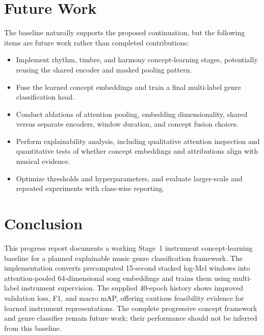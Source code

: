 \documentclass[conference]{IEEEtran}
\begin{document}
\section{Future Work}
The baseline naturally supports the proposed continuation, but the following items are future work rather than completed contributions:
\begin{itemize}
\item Implement rhythm, timbre, and harmony concept-learning stages, potentially reusing the shared encoder and masked pooling pattern.
\item Fuse the learned concept embeddings and train a final multi-label genre classification head.
\item Conduct ablations of attention pooling, embedding dimensionality, shared versus separate encoders, window duration, and concept fusion choices.
\item Perform explainability analysis, including qualitative attention inspection and quantitative tests of whether concept embeddings and attributions align with musical evidence.
\item Optimize thresholds and hyperparameters, and evaluate larger-scale and repeated experiments with class-wise reporting.
\end{itemize}

\section{Conclusion}
This progress report documents a working Stage~1 instrument concept-learning baseline for a planned explainable music genre classification framework. The implementation converts precomputed 15-second stacked log-Mel windows into attention-pooled 64-dimensional song embeddings and trains them using multi-label instrument supervision. The supplied 40-epoch history shows improved validation loss, F1, and macro mAP, offering cautious feasibility evidence for learned instrument representations. The complete progressive concept framework and genre classifier remain future work; their performance should not be inferred from this baseline.



\end{document}

